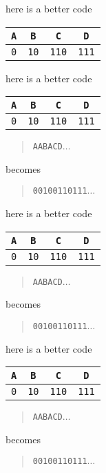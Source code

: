 \documentclass{beamer}
\newcommand{\cred}{\color{red}}
\newcommand{\cblu}{\color{blue}}
\newcommand{\cgre}{\color{green}}
\newcommand{\letter}[1]{\color{blue}\texttt{#1}\color{black}}
\newcommand{\binary}[1]{\color{red}\texttt{#1}\color{black}}
\begin{document}
\begin{frame}{here is a better code}
\begin{center}
\begin{tabular}{cccc}
\letter{A}&\letter{B}&\letter{C}&\letter{D}\\
\hline
\binary{0}&\binary{10}&\binary{110}&\binary{111}
\end{tabular}
\end{center}
\end{frame}  

\begin{frame}{here is a better code}
\begin{center}
\begin{tabular}{cccc}
\letter{A}&\letter{B}&\letter{C}&\letter{D}\\
\hline
\binary{0}&\binary{10}&\binary{110}&\binary{111}
\end{tabular}
\end{center}
  \begin{quote}
    \letter{AABACD}$\ldots$
  \end{quote}
  becomes
    \begin{quote}
    \binary{00100110111}$\ldots$
    \end{quote}
\end{frame}  

\begin{frame}{here is a better code}
\begin{center}
\begin{tabular}{cccc}
\letter{A}&\letter{B}&\letter{C}&\letter{D}\\
\hline
\binary{0}&\binary{10}&\binary{110}&\binary{111}
\end{tabular}
\end{center}
  \begin{quote}
    \letter{\cgre A\cblu{}ABACD}$\ldots$
  \end{quote}
  becomes
    \begin{quote}
    \binary{\cgre 0\cred{}0100110111}$\ldots$
    \end{quote}
\end{frame}  


\begin{frame}{here is a better code}
\begin{center}
\begin{tabular}{cccc}
\letter{A}&\letter{B}&\letter{C}&\letter{D}\\
\hline
\binary{0}&\binary{10}&\binary{110}&\binary{111}
\end{tabular}
\end{center}
  \begin{quote}
    \letter{A\cgre A\cblu{}BACD}$\ldots$
  \end{quote}
  becomes
    \begin{quote}
    \binary{0\cgre 0\cred{}100110111}$\ldots$
    \end{quote}
\end{frame}  
\end{document}
